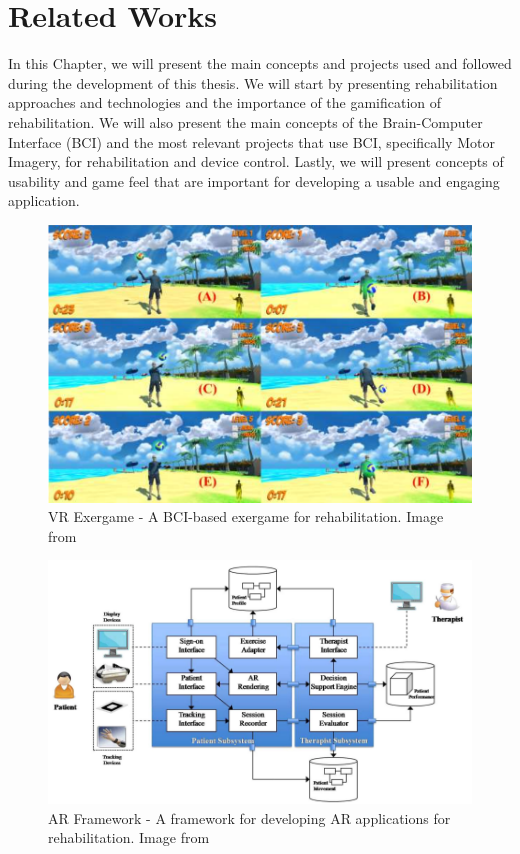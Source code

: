 \chapter{Related Works}\label{ch:related_works}
In this Chapter, we will present the main concepts and projects used and followed during the development of this thesis. 
We will start by presenting rehabilitation approaches and technologies and the importance of the gamification of rehabilitation. 
We will also present the main concepts of the Brain-Computer Interface (BCI) and the most relevant projects that use BCI, specifically Motor Imagery, for rehabilitation and device control.
Lastly, we will present concepts of usability and game feel that are important for developing a usable and engaging application.

\begin{figure}[htbp!]
    \centering
    \includegraphics[width=\textwidth]{Figures/Related/ave_exergame}
    \caption{VR Exergame - A BCI-based exergame for rehabilitation. Image from~\cite{trombetta}}\label{fig:exergame}
\end{figure}

\begin{figure}[htbp!]
    \centering
    \includegraphics[width=\textwidth]{Figures/Related/ar_app_framework}
    \caption{AR Framework - A framework for developing AR applications for rehabilitation. Image from~\cite{5567156}}\label{fig:ar_app_framework}
\end{figure}

